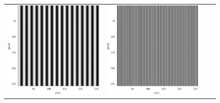 \begin{figure}[H]
\begin{tabularx}{\textwidth}{p{}CCC}
\begin{minipage}{.25\textwidth}
            \includegraphics[width=.9\textwidth,keepaspectratio]{../../Figures/08_12_img16.pdf}
        \end{minipage}     &
        \begin{minipage}{.25\textwidth}
            \centering
            \includegraphics[width=.9\textwidth,keepaspectratio]{../../Figures/08_13_img64.pdf}
        \end{minipage}                                                                 \\


\end{tabularx}
\end{figure}
